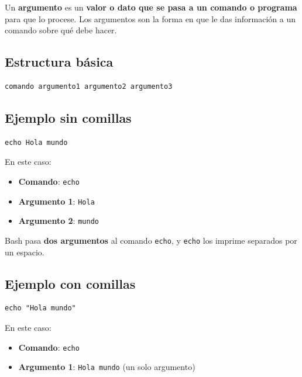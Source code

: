 \documentclass[
  spanish,
  12pt,
  letterpaper,
  DIV=11,
  numbers=noendperiod]{scrreprt}
\providecommand{\tightlist}{%
  \setlength{\itemsep}{0pt}\setlength{\parskip}{0pt}}
\begin{document}
\begin{tcolorbox}[enhanced jigsaw, arc=.35mm, bottomrule=.15mm, bottomtitle=1mm, breakable, colback=white, colbacktitle=quarto-callout-important-color!10!white, colframe=quarto-callout-important-color-frame, coltitle=black, left=2mm, leftrule=.75mm, opacityback=0, opacitybacktitle=0.6, rightrule=.15mm, title={¿Qué son los argumentos?}, titlerule=0mm, toprule=.15mm, toptitle=1mm]

Un \textbf{argumento} es un \textbf{valor o dato que se pasa a un
comando o programa} para que lo procese. Los argumentos son la forma en
que le das información a un comando sobre qué debe hacer.

\subsection{Estructura básica}\label{estructura-buxe1sica}

\begin{verbatim}
comando argumento1 argumento2 argumento3
\end{verbatim}

\subsection{Ejemplo sin comillas}\label{ejemplo-sin-comillas}

\begin{verbatim}
echo Hola mundo
\end{verbatim}

En este caso:

\begin{itemize}
\tightlist
\item
  \textbf{Comando}: \texttt{echo}
\item
  \textbf{Argumento 1}: \texttt{Hola}
\item
  \textbf{Argumento 2}: \texttt{mundo}
\end{itemize}

Bash pasa \textbf{dos argumentos} al comando \texttt{echo}, y
\texttt{echo} los imprime separados por un espacio.

\subsection{Ejemplo con comillas}\label{ejemplo-con-comillas}

\begin{verbatim}
echo "Hola mundo"
\end{verbatim}

En este caso:

\begin{itemize}
\tightlist
\item
  \textbf{Comando}: \texttt{echo}
\item
  \textbf{Argumento 1}: \texttt{Hola\ mundo} (un solo argumento)
\end{itemize}

\end{tcolorbox}
\end{document}
